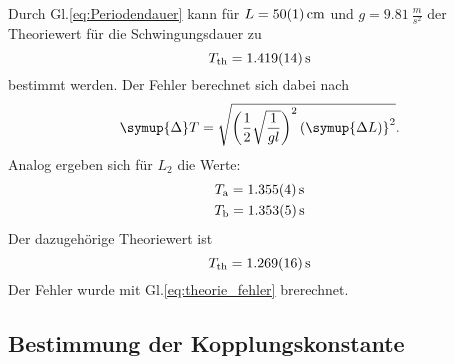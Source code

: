 \noindent Durch Gl.\eqref{eq:Periodendauer} kann für $L = \SI{50 +- 1}{cm} $ und $g = \SI{9.81}{\frac{m}{s^2}} $ der Theoriewert für die Schwingungsdauer zu
\begin{equation*}
    T_\text{th} = \SI{1.419 +- 0.014}{s}
\end{equation*}
bestimmt werden.
Der Fehler berechnet sich dabei nach
\begin{equation}
    \label{eq:theorie_fehler}
    \symup{\Delta} T = \sqrt{ \left( \frac{1}{2} \sqrt{ \frac{1}{g l} } \right)^2 ( \symup{\Delta L)}  ^2 } .
\end{equation}
Analog ergeben sich für $L_2$ die Werte:
\begin{gather*}
    T_\text{a} = \SI{1.355 +- 0.004}{s} \\
    T_\text{b} = \SI{1.353 +- 0.005}{s}
\end{gather*}
Der dazugehörige Theoriewert ist 
\begin{equation*}
    T_\text{th} = \SI{1.269 +- 0.016}{s}
\end{equation*}
Der Fehler wurde mit Gl.\eqref{eq:theorie_fehler} brerechnet.


\subsection{Bestimmung der Kopplungskonstante}
\label{sec:kopplung}

